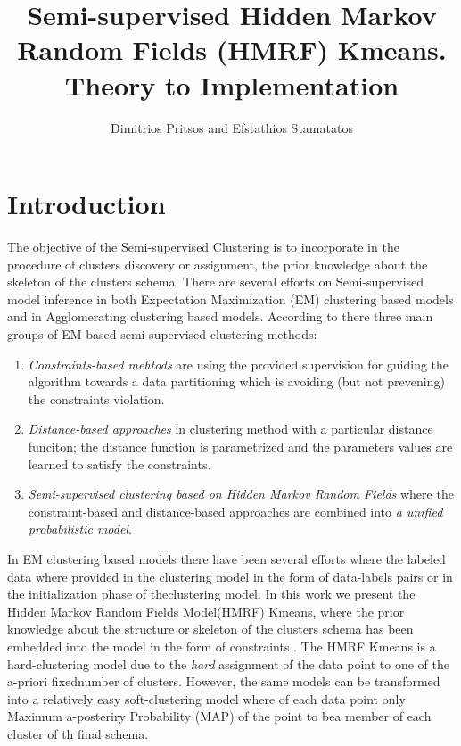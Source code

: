 \documentclass[dvips,dvipdfm,pdftex]{llncs}
\title{Semi-supervised Hidden Markov Random Fields (HMRF) Kmeans. Theory to Implementation\\}
\author{Dimitrios Pritsos and Efstathios Stamatatos}
\institute{University of the Aegean\\Karlovassi, Samos \textendash{} 83200, Greece.\\\{dpritsos, stamatatos\}@aegean.gr }
\begin{document}
\maketitle

\begin{abstrat}

\end{abstrat}


\section{Introduction}\label{sec:intro}
The objective of the Semi-supervised Clustering is to incorporate in the procedure of clusters discovery or assignment, the prior knowledge about the skeleton of the clusters schema. There are several efforts on Semi-supervised model inference in both Expectation Maximization (EM) clustering based models and in Agglomerating clustering based models. According to \cite{chapelle2006semi_hmrf_kmeans} there three main groups of EM based semi-supervised clustering methods:

\begin{enumerate}
	\item \emph{Constraints-based mehtods} are using the provided supervision for guiding the algorithm towards a data partitioning which is avoiding (but not prevening) the constraints violation.
	\item \emph{Distance-based approaches} in clustering method with a particular distance funciton; the distance function is parametrized and the parameters values are learned to satisfy the constraints.
	\item \emph{Semi-supervised clustering based on Hidden Markov Random Fields} where the constraint-based and distance-based approaches are combined into \emph{a unified probabilistic model}.
\end{enumerate}

In EM clustering based models there have been several efforts where the labeled data where provided in the clustering model in the form of data-labels pairs or in the initialization phase of theclustering model. In this work we present the Hidden Markov Random Fields Model(HMRF) Kmeans, where the prior knowledge about the structure or skeleton of the clusters schema has been embedded into the model in the form of constraints \cite{basu2004probabilistic}. The HMRF Kmeans is a hard-clustering model due to the \emph{hard} assignment of the data point to one of the a-priori fixednumber of clusters. However, the same models can be transformed into a relatively easy soft-clustering model where of each data point only Maximum a-posteriry Probability (MAP) of the point to bea member of each cluster of th final schema.
\end{document}
